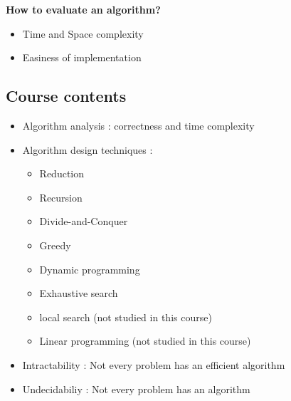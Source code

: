 \documentclass[twoside]{article}
\begin{document}
\textbf{How to evaluate an algorithm?}
\begin{itemize}
\item Time and Space complexity
\item Easiness of implementation
\end{itemize}

\subsection{Course contents}
\begin{itemize}
\item Algorithm analysis : correctness and time complexity
\item Algorithm design techniques : 
\begin{itemize}
\item Reduction
\item Recursion
\item Divide-and-Conquer
\item Greedy
\item Dynamic programming
\item Exhaustive search 
\item local search (not studied in this course)
\item Linear programming (not studied in this course)
\end{itemize}
\item Intractability : Not every problem has an efficient algorithm
\item Undecidabiliy : Not every problem has an algorithm
\end{itemize}
\end{document}

